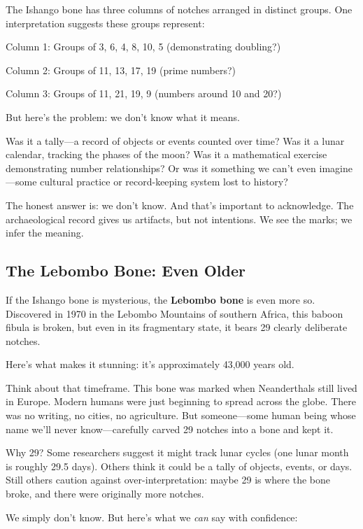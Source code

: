 The Ishango bone has three columns of notches arranged in distinct groups. One interpretation suggests these groups represent:
\begin{compactitem}
	\item Column 1: Groups of 3, 6, 4, 8, 10, 5 (demonstrating doubling?)
	\item Column 2: Groups of 11, 13, 17, 19 (prime numbers?)
	\item Column 3: Groups of 11, 21, 19, 9 (numbers around 10 and 20?)
\end{compactitem}

But here's the problem: we don't know what it means.

Was it a tally—a record of objects or events counted over time? Was it a lunar calendar, tracking the phases of the moon? Was it a mathematical exercise demonstrating number relationships? Or was it something we can't even imagine—some cultural practice or record-keeping system lost to history?

The honest answer is: we don't know. And that's important to acknowledge. The archaeological record gives us artifacts, but not intentions. We see the marks; we infer the meaning.

\subsection{The Lebombo Bone: Even Older}

If the Ishango bone is mysterious, the \textbf{Lebombo bone} is even more so. Discovered in 1970 in the Lebombo Mountains of southern Africa, this baboon fibula is broken, but even in its fragmentary state, it bears 29 clearly deliberate notches.

Here's what makes it stunning: it's approximately 43,000 years old.

Think about that timeframe. This bone was marked when Neanderthals still lived in Europe. Modern humans were just beginning to spread across the globe. There was no writing, no cities, no agriculture. But someone—some human being whose name we'll never know—carefully carved 29 notches into a bone and kept it.

Why 29? Some researchers suggest it might track lunar cycles (one lunar month is roughly 29.5 days). Others think it could be a tally of objects, events, or days. Still others caution against over-interpretation: maybe 29 is where the bone broke, and there were originally more notches.

We simply don't know. But here's what we \textit{can} say with confidence:

